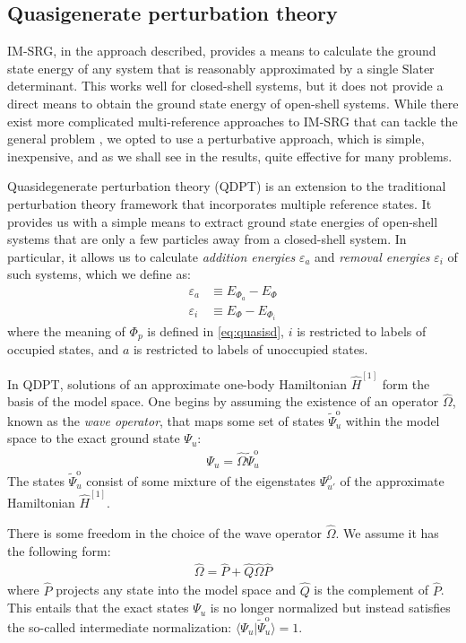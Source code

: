 \subsection{Quasigenerate perturbation theory}
\label{subsec:selfenergy}

IM-SRG, in the approach described, provides a means to calculate the ground state energy of any system that is reasonably approximated by a single Slater determinant.  This works well for closed-shell systems, but it does not provide a direct means to obtain the ground state energy of open-shell systems.  While there exist more complicated multi-reference approaches to IM-SRG that can tackle the general problem \cite{Hergert2016165}, we opted to use a perturbative approach, which is simple, inexpensive, and as we shall see in the results, quite effective for many problems.

Quasidegenerate perturbation theory (QDPT) is an extension to the traditional perturbation theory framework that incorporates multiple reference states.   It provides us with a simple means to extract ground state energies of open-shell systems that are only a few particles away from a closed-shell system.  In particular, it allows us to calculate \textit{addition energies} $\varepsilon_a$ and \textit{removal energies} $\varepsilon_i$ of such systems, which we define as:
\begin{align}
  \varepsilon_a &\equiv E_{\Phi_a} - E_{\Phi} \\
  \varepsilon_i &\equiv E_{\Phi} - E_{\Phi_i}
\end{align}
where the meaning of $\Phi_p$ is defined in \eqref{eq:quasisd}, $i$ is restricted to labels of occupied states, and $a$ is restricted to labels of unoccupied states.

In QDPT, solutions of an approximate one-body Hamiltonian $\hat{H}^{[1]}$ form the basis of the model space.  One begins by assuming the existence of an operator $\hat{\Omega}$, known as the \textit{wave operator}, that maps some set of states $\tilde \Psi^{\mathrm{o}}_u$ within the model space to the exact ground state $\Psi_u$:
\begin{align} \label{eq:omega-condition1}
  \Psi_u = \hat \Omega \tilde \Psi^{\mathrm{o}}_u
\end{align}
The states $\tilde \Psi^{\mathrm{o}}_u$ consist of some mixture of the eigenstates $\Psi^{\mathrm{o}}_{u'}$ of the approximate Hamiltonian $\hat{H}^{[1]}$.

There is some freedom in the choice of the wave operator $\hat \Omega$.  We assume it has the following form:
\begin{align} \label{eq:omega-condition2}
  \hat \Omega = \hat P + \hat Q \hat \Omega \hat P
\end{align}
where $\hat P$ projects any state into the model space and $\hat Q$ is the complement of $\hat P$.  This entails that the exact states $\Psi_u$ is no longer normalized but instead satisfies the so-called intermediate normalization: $\langle \Psi_u | \tilde \Psi^{\mathrm{o}}_u \rangle = 1$.

